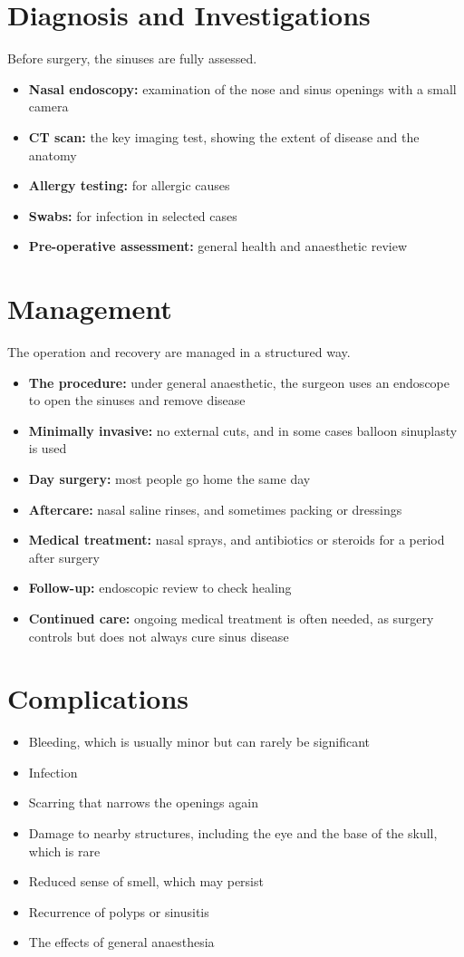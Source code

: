 \section*{Diagnosis and Investigations}
Before surgery, the sinuses are fully assessed.
\begin{itemize}
    \item \textbf{Nasal endoscopy:} examination of the nose and sinus openings with a small camera
    \item \textbf{CT scan:} the key imaging test, showing the extent of disease and the anatomy
    \item \textbf{Allergy testing:} for allergic causes
    \item \textbf{Swabs:} for infection in selected cases
    \item \textbf{Pre-operative assessment:} general health and anaesthetic review
\end{itemize}

\section*{Management}
The operation and recovery are managed in a structured way.
\begin{itemize}
    \item \textbf{The procedure:} under general anaesthetic, the surgeon uses an endoscope to open the sinuses and remove disease
    \item \textbf{Minimally invasive:} no external cuts, and in some cases balloon sinuplasty is used
    \item \textbf{Day surgery:} most people go home the same day
    \item \textbf{Aftercare:} nasal saline rinses, and sometimes packing or dressings
    \item \textbf{Medical treatment:} nasal sprays, and antibiotics or steroids for a period after surgery
    \item \textbf{Follow-up:} endoscopic review to check healing
    \item \textbf{Continued care:} ongoing medical treatment is often needed, as surgery controls but does not always cure sinus disease
\end{itemize}

\section*{Complications}
\begin{itemize}
    \item Bleeding, which is usually minor but can rarely be significant
    \item Infection
    \item Scarring that narrows the openings again
    \item Damage to nearby structures, including the eye and the base of the skull, which is rare
    \item Reduced sense of smell, which may persist
    \item Recurrence of polyps or sinusitis
    \item The effects of general anaesthesia
\end{itemize}

